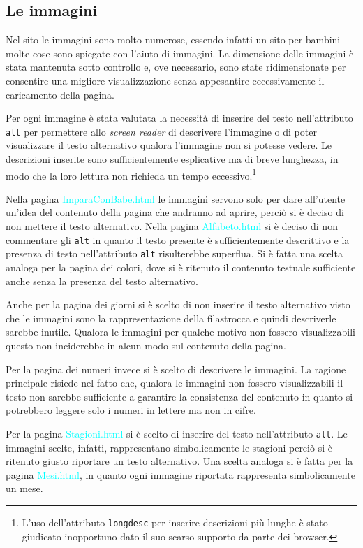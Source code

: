 \documentclass[10pt,a4paper,onecolumn]{article}
\newcommand{\sitepage}[1]{\textcolor{cyan}{\textsf{#1}}}
\newcommand{\inglese}[1]{\foreignlanguage{english}{\itshape{}#1}}
\begin{document}
\subsection{Le immagini}
Nel sito le immagini sono molto numerose, essendo infatti un sito per bambini molte cose sono spiegate con l'aiuto di immagini. La dimensione delle immagini è stata mantenuta sotto controllo e, ove necessario, sono state ridimensionate per consentire una migliore visualizzazione senza appesantire eccessivamente il caricamento della pagina.

Per ogni immagine è stata valutata la necessità di inserire del testo nell'attributo \texttt{alt} per permettere allo \inglese{screen reader} di descrivere l'immagine o di poter visualizzare il testo alternativo qualora l'immagine non si potesse vedere. Le descrizioni inserite sono sufficientemente esplicative ma di breve lunghezza, in modo che la loro lettura non richieda un tempo eccessivo.\footnote{%
    L'uso dell'attributo \texttt{longdesc} per inserire descrizioni più lunghe è stato giudicato inopportuno dato il suo scarso supporto da parte dei browser.
}

Nella pagina \sitepage{ImparaConBabe.html} le immagini servono solo per dare all'utente un'idea del contenuto della pagina che andranno ad aprire, perciò si è deciso di non mettere il testo alternativo. 
Nella pagina \sitepage{Alfabeto.html} si è deciso di non commentare gli \texttt{alt} in quanto il testo presente è sufficientemente descrittivo e la presenza di testo nell'attributo \texttt{alt} risulterebbe superflua.
Si è fatta una scelta analoga per la pagina dei colori, dove si è ritenuto il contenuto testuale sufficiente anche senza la presenza del testo alternativo.

Anche per la pagina dei giorni si è scelto di non inserire il testo alternativo visto che le immagini sono la rappresentazione della filastrocca e quindi descriverle sarebbe inutile.
Qualora le immagini per qualche motivo non fossero visualizzabili questo non inciderebbe in alcun modo sul contenuto della pagina.

Per la pagina dei numeri invece si è scelto di descrivere le immagini.
La ragione principale risiede nel fatto che, qualora le immagini non fossero visualizzabili il testo non sarebbe sufficiente a garantire la consistenza del contenuto in quanto si potrebbero leggere solo i numeri in lettere ma non in cifre.

Per la pagina \sitepage{Stagioni.html} si è scelto di inserire del testo nell'attributo \texttt{alt}. Le immagini scelte, infatti,  rappresentano simbolicamente le stagioni perciò si è ritenuto giusto riportare un testo alternativo.
Una scelta analoga si è fatta per la pagina \sitepage{Mesi.html}, in quanto ogni immagine riportata rappresenta simbolicamente un mese.
\end{document}
